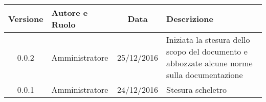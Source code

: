 
\begin{center}
	\begin{tabular}{cp{3cm}cp{3cm}}
	\textbf{Versione} & \textbf{Autore e Ruolo} & \textbf{Data} & \textbf{Descrizione} \\ \hline
	0.0.2 & {\GG} Amministratore & 25/12/2016 & Iniziata la stesura dello scopo del documento e abbozzate alcune norme sulla documentazione \\ \hline
	0.0.1 & {\MM} Amministratore & 24/12/2016 & Stesura scheletro \\ \hline
	\end{tabular}
\end{center}

